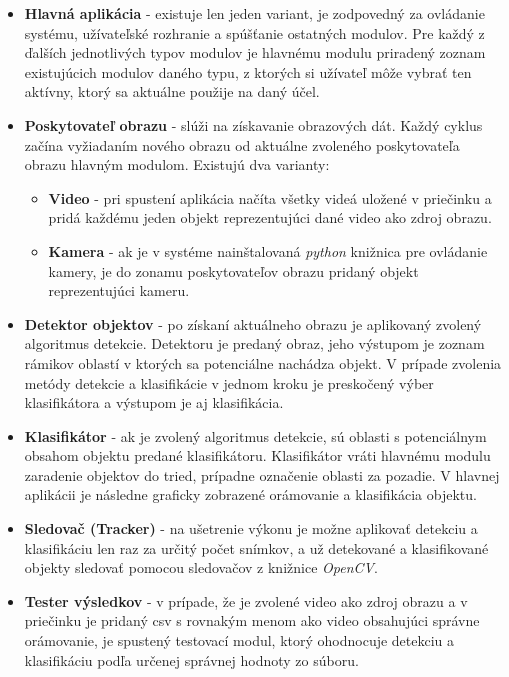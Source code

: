         \begin{itemize}
            \item \textbf{Hlavná aplikácia} - existuje len jeden variant, je zodpovedný za ovládanie systému, užívateľské rozhranie a spúšťanie ostatných modulov. Pre každý z ďalších jednotlivých typov modulov je hlavnému modulu priradený zoznam existujúcich modulov daného typu, z ktorých si užívateľ môže vybrať ten aktívny, ktorý sa aktuálne použije na daný účel.
            \item \textbf{Poskytovateľ obrazu} - slúži na získavanie obrazových dát. Každý cyklus začína vyžiadaním nového obrazu od aktuálne zvoleného poskytovateľa obrazu hlavným modulom. Existujú dva varianty:
            \begin{itemize}
                \item \textbf{Video} - pri spustení aplikácia načíta všetky videá uložené v priečinku  a pridá každému jeden objekt reprezentujúci dané video ako zdroj obrazu.
                \item \textbf{Kamera} - ak je v systéme nainštalovaná \emph{python} knižnica pre ovládanie kamery, je do zonamu poskytovateľov obrazu pridaný objekt reprezentujúci kameru.
            \end{itemize}
            \item \textbf{Detektor objektov} - po získaní aktuálneho obrazu je aplikovaný zvolený algoritmus detekcie. Detektoru je predaný obraz, jeho výstupom je zoznam rámikov oblastí v ktorých sa potenciálne nachádza objekt. V prípade zvolenia metódy detekcie a klasifikácie v jednom kroku je preskočený výber klasifikátora a výstupom je aj klasifikácia. 
            \item \textbf{Klasifikátor} - ak je zvolený algoritmus detekcie, sú oblasti s potenciálnym obsahom objektu predané klasifikátoru. Klasifikátor vráti hlavnému modulu zaradenie objektov do tried, prípadne označenie oblasti za pozadie. V hlavnej aplikácii je následne graficky zobrazené orámovanie a klasifikácia objektu.
            \item \textbf{Sledovač (Tracker)} - na ušetrenie výkonu je možne aplikovať detekciu a klasifikáciu len raz za určitý počet snímkov, a už detekované a klasifikované objekty sledovať pomocou sledovačov z knižnice \emph{OpenCV}.
            \item \textbf{Tester výsledkov} - v prípade, že je zvolené video ako zdroj obrazu a v priečinku  je pridaný \ac{csv} s rovnakým menom ako video obsahujúci správne orámovanie, je spustený testovací modul, ktorý ohodnocuje detekciu a klasifikáciu podľa určenej správnej hodnoty zo súboru.
        \end{itemize}

